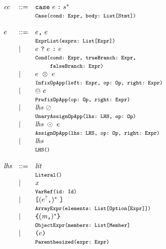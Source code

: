 \[\begin{array}{llll}
\cc &::=& {\tt case} \ \expr \; \verb+:+ \; \stmt^{*} \\
&& \mtt{Case(cond:~Expr, body:~List[Stmt])}\\\\

\expr &::=& \expr\verb+,+ \ \expr \\
&& \mtt{ExprList(exprs:~List[Expr])}\\
  &\mid& \expr \ \verb+?+ \ \expr \ \verb+:+ \ \expr \\
&& \mtt{Cond(cond:~Expr, trueBranch:~Expr,}\\
&& \mtt{\phantom{Cond(}falseBranch:~Expr)}\\
  &\mid& \expr \ \inop \ \expr \\
&& \mtt{InfixOpApp(left:~Expr, op:~Op, right:~Expr)}\\
  &\mid& \preop \ \expr \\
&& \mtt{PrefixOpApp(op:~Op, right:~Expr)}\\
  &\mid& \lhs \ \postop \\
&& \mtt{UnaryAssignOpApp(lhs:~LHS, op:~Op)}\\
  &\mid& \lhs \ \aop \ \expr \\
&& \mtt{AssignOpApp(lhs:~LHS, op:~Op, right:~Expr)}\\
  &\mid& \lhs \\
&& \mtt{LHS()}\\\\
\lhs &::=& \lit \\
&& \mtt{Literal()}\\
 &\mid& \myid \\
&& \mtt{VarRef(id:~Id)}\\
 &\mid& \verb+[+ (\expr^?\verb+,+)^* \ \verb+]+ \\
&& \mtt{ArrayExpr(elements:~List[Option[Expr]])}\\
 &\mid& \verb+{+ (\member\verb+,+)^* \verb+}+ \\
&& \mtt{ObjectExpr(members:~List[Member]}\\
 &\mid& \verb+(+ \expr \verb+)+ \\
&& \mtt{Parenthesized(expr:~Expr)}\\
\end{array}
\]

